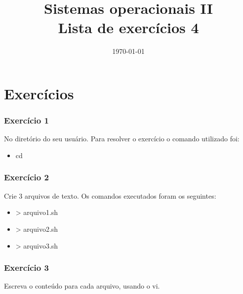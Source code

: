 \documentclass[
	12pt,				%
	openany,			%
	a4paper,			%
	chapter=TITLE,		%
	section=TITLE,		%
	english,
	brazil				%
]{abntex2}
\title{Sistemas operacionais II \\ Lista de exercícios 4}
\date{\today}
\begin{document}
\maketitle

\chapter{Exercícios}

\subsection{Exercício 1}

No diretório do seu usuário.
Para resolver o exercício o comando utilizado foi:

\begin{itemize}
\item cd 
\end{itemize}

\subsection{Exercício 2}

Crie 3 arquivos de texto. Os comandos executados foram os seguintes:

\begin{itemize}
	\item > arquivo1.sh 
	\item > arquivo2.sh
	\item > arquivo3.sh
\end{itemize}

\subsection{Exercício 3}

Escreva o conteúdo para cada arquivo, usando o vi.
\end{document}
